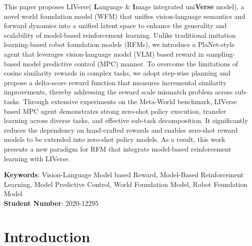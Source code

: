 \documentclass[11pt]{article}
\begin{document}
This paper proposes LIVerse( \textbf{L}anguage \& \textbf{I}mage integrated uni\textbf{Verse} model), a novel world foundation model (WFM) that unifies vision-language semantics and forward dynamics into a unified latent space to enhance the generality and scalability of model-based reinforcement learning. Unlike traditional imitation learning-based robot foundation models (RFMs), we introduce a PlaNet-style agent that leverages vision-language model (VLM) based reward in sampling-based model predictive control (MPC) manner. To overcome the limitations of cosine similarity rewards in complex tasks, we adopt step-wise planning and propose a delta-score reward function that measures incremental similarity improvements, thereby addressing the reward scale mismatch problem across sub-tasks. Through extensive experiments on the Meta-World benchmark, LIVerse based MPC agent demonstrates strong zero-shot policy execution, transfer learning across diverse tasks, and effective sub-task decomposition. It significantly reduces the dependency on hand-crafted rewards and enables zero-shot reward models to be extended into zero-shot policy models. As a result, this work presents a new paradigm for RFM that integrate model-based reinforcement learning with LIVerse.

\vspace{1cm}
\noindent\textbf{Keywords}: Vision-Language Model based Reward, Model-Based Reinforcement Learning, Model Predictive Control, World Foundation Model, Robot Foundation Model\\
\vspace{0.5cm}
\noindent\textbf{Student Number}: 2020-12295

\clearpage

\tableofcontents
\clearpage
\listoffigures
\clearpage


\section{Introduction}
\end{document}
